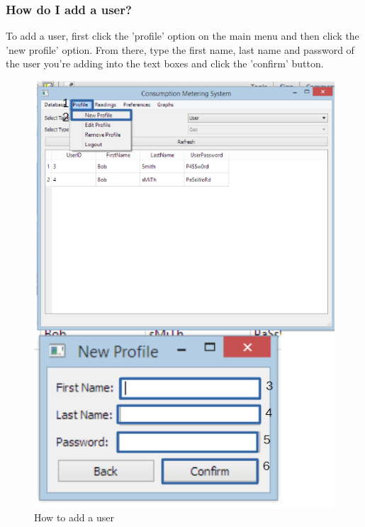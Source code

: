 \subsubsection{How do I add a user?}\label{question:add_user}
To add a user, first click the 'profile' option on the main menu and then click the 'new profile' option. From there, type the first name, last name and password of the user you're adding into the text boxes and click the 'confirm' button.
\begin{figure}[H]
	\includegraphics{./manual/images/add_user.png}
	\caption{How to add a user}
\end{figure}

